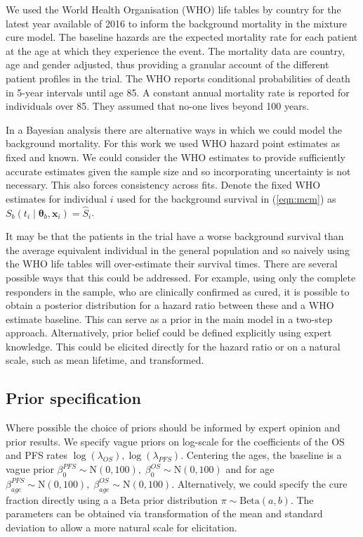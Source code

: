 \documentclass[AMA,STIX1COL]{WileyNJD-v2}
\begin{document}
We used the World Health Organisation (WHO) life tables by country for the latest year available of 2016
\cite{wholifetables} to inform the background mortality in the mixture cure model.
The baseline hazards are the expected mortality rate for each patient at the age at which they experience the event.
The mortality data are country, age and gender adjusted, thus providing a granular account of
the different patient profiles in the trial.
The WHO reports conditional probabilities of death in 5-year intervals until age 85.
A constant annual mortality rate is reported for individuals over 85. They assumed that no-one lives beyond 100 years.

In a Bayesian analysis there are alternative ways in which we could model the background mortality.
For this work we used WHO hazard point estimates as fixed and known.
We could consider the WHO estimates to provide sufficiently accurate estimates
given the sample size and so incorporating uncertainty is not necessary. This also forces consistency across fits.
Denote the fixed WHO estimates for individual $i$ used for the background survival in (\ref{eqn:mcm}) as
$S_b(t_i \mid \bm\theta_b, \bm{x}_i) = \hat{S}_i$.

It may be that the patients in the trial have a worse background survival than the average equivalent individual in the general population and so naively using the WHO life tables will over-estimate their survival times.
There are several possible ways that this could be addressed.
For example, using only the complete responders in the sample, who are clinically confirmed as cured, it is possible to obtain a posterior distribution for a hazard ratio between these and a WHO estimate baseline.
This can serve as a prior in the main model in a two-step approach. Alternatively, prior belief could be defined explicitly using expert knowledge.
This could be elicited directly for the hazard ratio or on a natural scale, such as mean lifetime, and transformed.

%
\subsection{Prior specification}
Where possible the choice of priors should be informed by expert opinion and prior results.
We specify vague priors on log-scale for the coefficients of the OS and PFS rates $\log(\lambda_{OS}),  \log(\lambda_{PFS})$.
Centering the ages, the baseline is a vague prior ${\beta_0^{PFS} \sim \text{N}(0, 100),}\; {\beta_0^{OS} \sim \text{N}(0, 100)}$
and for age $\beta_{age}^{PFS} \sim \text{N}(0, 100),\; \beta_{age}^{OS} \sim \text{N}(0, 100)$.
Alternatively, we could specify the cure fraction directly using a a Beta prior distribution $\pi \sim \text{Beta}(a, b)$.
The parameters can be obtained via transformation of the mean and standard deviation to allow a more natural scale for elicitation.
\end{document}
